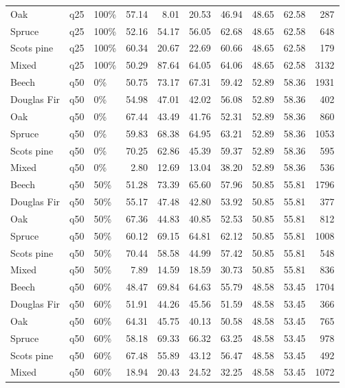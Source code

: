 \begin{longtable}{lllrrrrrrr}
  Oak & q25 & 100\% & 57.14 & 8.01 & 20.53 & 46.94 & 48.65 & 62.58 & 287 \\ 
  Spruce & q25 & 100\% & 52.16 & 54.17 & 56.05 & 62.68 & 48.65 & 62.58 & 648 \\ 
  Scots pine & q25 & 100\% & 60.34 & 20.67 & 22.69 & 60.66 & 48.65 & 62.58 & 179 \\ 
  Mixed & q25 & 100\% & 50.29 & 87.64 & 64.05 & 64.06 & 48.65 & 62.58 & 3132 \\ 
  Beech & q50 & 0\% & 50.75 & 73.17 & 67.31 & 59.42 & 52.89 & 58.36 & 1931 \\ 
  Douglas Fir & q50 & 0\% & 54.98 & 47.01 & 42.02 & 56.08 & 52.89 & 58.36 & 402 \\ 
  Oak & q50 & 0\% & 67.44 & 43.49 & 41.76 & 52.31 & 52.89 & 58.36 & 860 \\ 
  Spruce & q50 & 0\% & 59.83 & 68.38 & 64.95 & 63.21 & 52.89 & 58.36 & 1053 \\ 
  Scots pine & q50 & 0\% & 70.25 & 62.86 & 45.39 & 59.37 & 52.89 & 58.36 & 595 \\ 
  Mixed & q50 & 0\% & 2.80 & 12.69 & 13.04 & 38.20 & 52.89 & 58.36 & 536 \\ 
  Beech & q50 & 50\% & 51.28 & 73.39 & 65.60 & 57.96 & 50.85 & 55.81 & 1796 \\ 
  Douglas Fir & q50 & 50\% & 55.17 & 47.48 & 42.80 & 53.92 & 50.85 & 55.81 & 377 \\ 
  Oak & q50 & 50\% & 67.36 & 44.83 & 40.85 & 52.53 & 50.85 & 55.81 & 812 \\ 
  Spruce & q50 & 50\% & 60.12 & 69.15 & 64.81 & 62.12 & 50.85 & 55.81 & 1008 \\ 
  Scots pine & q50 & 50\% & 70.44 & 58.58 & 44.99 & 57.42 & 50.85 & 55.81 & 548 \\ 
  Mixed & q50 & 50\% & 7.89 & 14.59 & 18.59 & 30.73 & 50.85 & 55.81 & 836 \\ 
  Beech & q50 & 60\% & 48.47 & 69.84 & 64.63 & 55.79 & 48.58 & 53.45 & 1704 \\ 
  Douglas Fir & q50 & 60\% & 51.91 & 44.26 & 45.56 & 51.59 & 48.58 & 53.45 & 366 \\ 
  Oak & q50 & 60\% & 64.31 & 45.75 & 40.13 & 50.58 & 48.58 & 53.45 & 765 \\ 
  Spruce & q50 & 60\% & 58.18 & 69.33 & 66.32 & 63.25 & 48.58 & 53.45 & 978 \\ 
  Scots pine & q50 & 60\% & 67.48 & 55.89 & 43.12 & 56.47 & 48.58 & 53.45 & 492 \\ 
  Mixed & q50 & 60\% & 18.94 & 20.43 & 24.52 & 32.25 & 48.58 & 53.45 & 1072 \\ 

\end{longtable}
